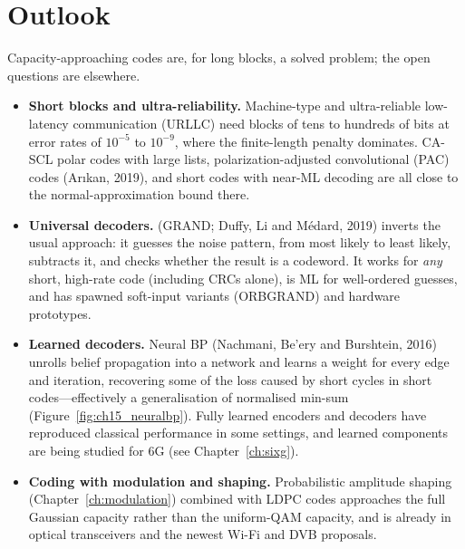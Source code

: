 \section{Outlook}
\label{sec:ch15:outlook}

Capacity-approaching codes are, for long blocks, a solved problem; the open questions are elsewhere.

\begin{itemize}
\item \textbf{Short blocks and ultra-reliability.} Machine-type and ultra-reliable low-latency
communication (URLLC) need blocks of tens to hundreds of bits at error rates of $10^{-5}$ to
$10^{-9}$, where the finite-length penalty dominates. CA-SCL polar codes with large lists,
polarization-adjusted convolutional (PAC) codes (Ar\i kan, 2019), and short codes with near-ML
decoding are all close to the normal-approximation bound there.
\item \textbf{Universal decoders.}  (GRAND; Duffy, Li
and M\'edard, 2019) inverts the usual approach: it guesses the noise pattern, from most likely to
least likely, subtracts it, and checks whether the result is a codeword. It works for \emph{any}
short, high-rate code (including CRCs alone), is ML for well-ordered guesses, and has spawned
soft-input variants (ORBGRAND) and hardware prototypes.
\item \textbf{Learned decoders.} Neural BP (Nachmani, Be'ery and Burshtein, 2016) unrolls belief
propagation into a network and learns a weight for every edge and iteration, recovering some of the
loss caused by short cycles in short codes---effectively a generalisation of normalised min-sum
(Figure~\ref{fig:ch15_neuralbp}).
Fully learned encoders and decoders have reproduced classical performance in some settings, and
learned components are being studied for 6G (see Chapter~\ref{ch:sixg}).
\item \textbf{Coding with modulation and shaping.} Probabilistic amplitude shaping
(Chapter~\ref{ch:modulation}) combined with LDPC codes approaches the full Gaussian capacity rather than
the uniform-QAM capacity, and is already in optical transceivers and the newest Wi-Fi and DVB
proposals.
\end{itemize}

